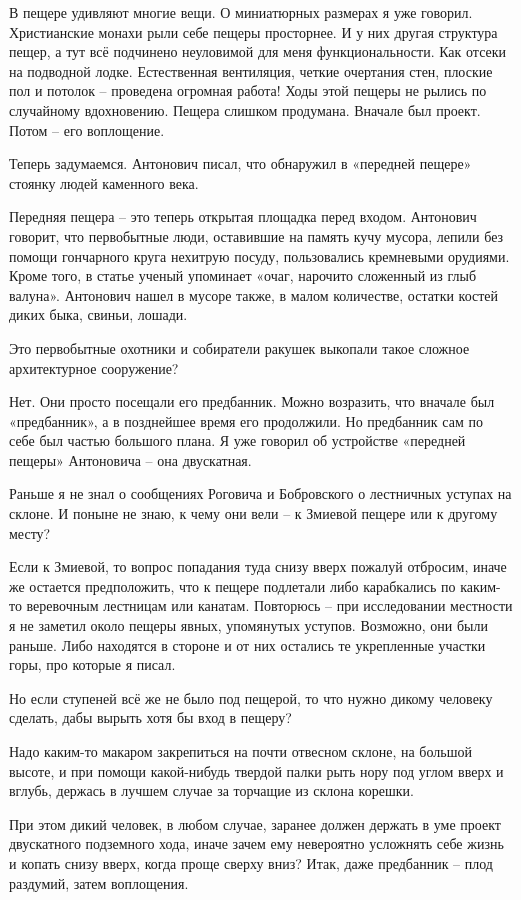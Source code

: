 В пещере удивляют многие вещи. О миниатюрных размерах я уже говорил. Христианские монахи рыли себе пещеры просторнее. И у них другая структура пещер, а тут всё подчинено неуловимой для меня функциональности. Как отсеки на подводной лодке. Естественная вентиляция, четкие очертания стен, плоские пол и потолок – проведена огромная работа! Ходы этой пещеры не рылись по случайному вдохновению. Пещера слишком продумана. Вначале был проект. Потом – его воплощение.

Теперь задумаемся. Антонович писал, что обнаружил в «передней пещере» стоянку людей каменного века. 

Передняя пещера – это теперь открытая площадка перед входом. Антонович говорит, что первобытные люди, оставившие на память кучу мусора, лепили без помощи гончарного круга нехитрую посуду, пользовались кремневыми орудиями. Кроме того, в статье ученый упоминает «очаг, нарочито сложенный из глыб валуна». Антонович нашел в мусоре также, в малом количестве, остатки костей диких быка, свиньи, лошади.

Это первобытные охотники и собиратели ракушек выкопали такое сложное архитектурное сооружение? 

Нет. Они просто посещали его предбанник. Можно возразить, что вначале был «предбанник», а в позднейшее время его продолжили. Но предбанник сам по себе был частью большого плана. Я уже говорил об устройстве «передней пещеры» Антоновича – она двускатная.

Раньше я не знал о сообщениях Роговича и Бобровского о лестничных уступах на склоне. И поныне не знаю, к чему они вели – к Змиевой пещере или к другому месту? 

Если к Змиевой, то вопрос попадания туда снизу вверх пожалуй отбросим, иначе же остается предположить, что к пещере подлетали либо карабкались по каким-то веревочным лестницам или канатам. Повторюсь – при исследовании местности я не заметил около пещеры явных, упомянутых уступов. Возможно, они были раньше. Либо находятся в стороне и от них остались те укрепленные участки горы, про которые я писал.

Но если ступеней всё же не было под пещерой, то что нужно дикому человеку сделать, дабы вырыть хотя бы вход в пещеру? 

Надо каким-то макаром закрепиться на почти отвесном склоне, на большой высоте, и при помощи какой-нибудь твердой палки рыть нору под углом вверх и вглубь, держась в лучшем случае за торчащие из склона корешки.

При этом дикий человек, в любом случае, заранее должен держать в уме проект двускатного подземного хода, иначе зачем ему невероятно усложнять себе жизнь и копать снизу вверх, когда проще сверху вниз? Итак, даже предбанник – плод раздумий, затем воплощения.

